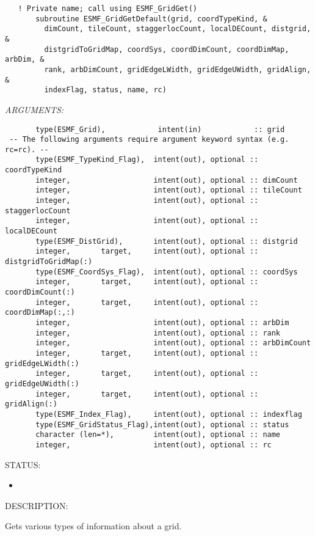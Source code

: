  
\begin{verbatim}   ! Private name; call using ESMF_GridGet()
       subroutine ESMF_GridGetDefault(grid, coordTypeKind, &
         dimCount, tileCount, staggerlocCount, localDECount, distgrid, &
         distgridToGridMap, coordSys, coordDimCount, coordDimMap, arbDim, &
         rank, arbDimCount, gridEdgeLWidth, gridEdgeUWidth, gridAlign,  &
         indexFlag, status, name, rc)\end{verbatim}{\em ARGUMENTS:}
\begin{verbatim}       type(ESMF_Grid),            intent(in)            :: grid
 -- The following arguments require argument keyword syntax (e.g. rc=rc). --
       type(ESMF_TypeKind_Flag),  intent(out), optional :: coordTypeKind
       integer,                   intent(out), optional :: dimCount
       integer,                   intent(out), optional :: tileCount
       integer,                   intent(out), optional :: staggerlocCount
       integer,                   intent(out), optional :: localDECount
       type(ESMF_DistGrid),       intent(out), optional :: distgrid
       integer,       target,     intent(out), optional :: distgridToGridMap(:)
       type(ESMF_CoordSys_Flag),  intent(out), optional :: coordSys
       integer,       target,     intent(out), optional :: coordDimCount(:)
       integer,       target,     intent(out), optional :: coordDimMap(:,:)
       integer,                   intent(out), optional :: arbDim
       integer,                   intent(out), optional :: rank
       integer,                   intent(out), optional :: arbDimCount
       integer,       target,     intent(out), optional :: gridEdgeLWidth(:)
       integer,       target,     intent(out), optional :: gridEdgeUWidth(:)
       integer,       target,     intent(out), optional :: gridAlign(:)
       type(ESMF_Index_Flag),     intent(out), optional :: indexflag
       type(ESMF_GridStatus_Flag),intent(out), optional :: status
       character (len=*),         intent(out), optional :: name
       integer,                   intent(out), optional :: rc\end{verbatim}
{\sf STATUS:}
   \begin{itemize}
   \item{}
   \end{itemize}
  
{\sf DESCRIPTION:\\ }


      Gets various types of information about a grid.
  

